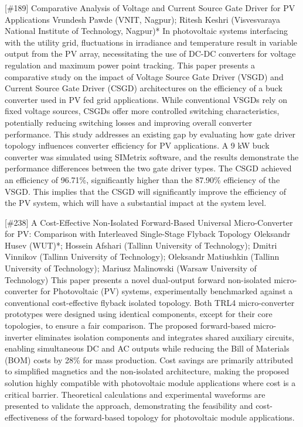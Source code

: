 {} \begin{abstract_online} {[\#189] Comparative Analysis of Voltage and Current Source Gate Driver for PV Applications} {} {Vrundesh Pawde (VNIT, Nagpur); Ritesh Keshri (Visvesvaraya National Institute of Technology, Nagpur)*} {} In photovoltaic systems interfacing with the utility grid, fluctuations in irradiance and temperature result in variable output from the PV array, necessitating the use of DC-DC converters for voltage regulation and maximum power point tracking. This paper presents a comparative study on the impact of Voltage Source Gate Driver (VSGD) and Current Source Gate Driver (CSGD) architectures on the efficiency of a buck converter used in PV fed grid applications. While conventional VSGDs rely on fixed voltage sources, CSGDs offer more controlled switching characteristics, potentially reducing switching losses and improving overall converter performance. This study addresses an existing gap by evaluating how gate driver topology influences converter efficiency for PV applications. A 9 kW buck converter was simulated using SIMetrix software, and the results demonstrate the performance differences between the two gate driver types. The CSGD achieved an efficiency of 96.71\%, significantly higher than the 87.90\% efficiency of the VSGD. This implies that the CSGD will significantly improve the efficiency of the PV system, which will have a substantial impact at the system level. \end{abstract_online} 
{} \begin{abstract_online} {[\#238] A Cost-Effective Non-Isolated Forward-Based Universal Micro-Converter for PV: Comparison with Interleaved Single-Stage Flyback Topology} {} {Oleksandr Husev (WUT)*; Hossein Afshari (Tallinn University of Technology); Dmitri Vinnikov (Tallinn University of Technology); Oleksandr Matiushkin (Tallinn University of Technology); Mariusz Malinowski (Warsaw University of Technology)} {} This paper presents a novel dual-output forward non-isolated micro-converter for Photovoltaic (PV) systems, experimentally benchmarked against a conventional cost-effective flyback isolated topology. Both TRL4 micro-converter prototypes were designed using identical components, except for their core topologies, to ensure a fair comparison. The proposed forward-based micro-inverter eliminates isolation components and integrates shared auxiliary circuits, enabling simultaneous DC and AC outputs while reducing the Bill of Materials (BOM) costs by 28\% for mass production. Cost savings are primarily attributed to simplified magnetics and the non-isolated architecture, making the proposed solution highly compatible with photovoltaic module applications where cost is a critical barrier. Theoretical calculations and experimental waveforms are presented to validate the approach, demonstrating the feasibility and cost-effectiveness of the forward-based topology for photovoltaic module applications. \end{abstract_online} 
